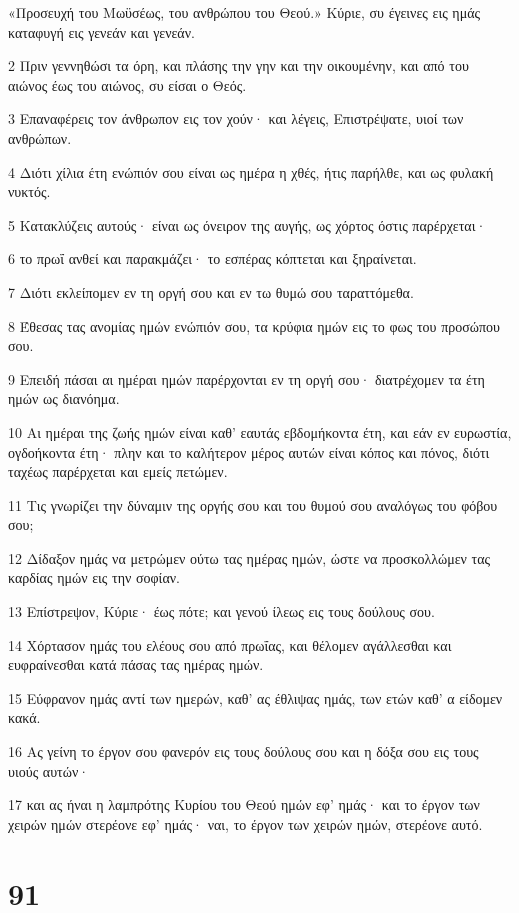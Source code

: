 \par «Προσευχή του Μωϋσέως, του ανθρώπου του Θεού.» Κύριε, συ έγεινες εις ημάς καταφυγή εις γενεάν και γενεάν.
\par 2 Πριν γεννηθώσι τα όρη, και πλάσης την γην και την οικουμένην, και από του αιώνος έως του αιώνος, συ είσαι ο Θεός.
\par 3 Επαναφέρεις τον άνθρωπον εις τον χούν· και λέγεις, Επιστρέψατε, υιοί των ανθρώπων.
\par 4 Διότι χίλια έτη ενώπιόν σου είναι ως ημέρα η χθές, ήτις παρήλθε, και ως φυλακή νυκτός.
\par 5 Κατακλύζεις αυτούς· είναι ως όνειρον της αυγής, ως χόρτος όστις παρέρχεται·
\par 6 το πρωΐ ανθεί και παρακμάζει· το εσπέρας κόπτεται και ξηραίνεται.
\par 7 Διότι εκλείπομεν εν τη οργή σου και εν τω θυμώ σου ταραττόμεθα.
\par 8 Έθεσας τας ανομίας ημών ενώπιόν σου, τα κρύφια ημών εις το φως του προσώπου σου.
\par 9 Επειδή πάσαι αι ημέραι ημών παρέρχονται εν τη οργή σου· διατρέχομεν τα έτη ημών ως διανόημα.
\par 10 Αι ημέραι της ζωής ημών είναι καθ' εαυτάς εβδομήκοντα έτη, και εάν εν ευρωστία, ογδοήκοντα έτη· πλην και το καλήτερον μέρος αυτών είναι κόπος και πόνος, διότι ταχέως παρέρχεται και εμείς πετώμεν.
\par 11 Τις γνωρίζει την δύναμιν της οργής σου και του θυμού σου αναλόγως του φόβου σου;
\par 12 Δίδαξον ημάς να μετρώμεν ούτω τας ημέρας ημών, ώστε να προσκολλώμεν τας καρδίας ημών εις την σοφίαν.
\par 13 Επίστρεψον, Κύριε· έως πότε; και γενού ίλεως εις τους δούλους σου.
\par 14 Χόρτασον ημάς του ελέους σου από πρωΐας, και θέλομεν αγάλλεσθαι και ευφραίνεσθαι κατά πάσας τας ημέρας ημών.
\par 15 Εύφρανον ημάς αντί των ημερών, καθ' ας έθλιψας ημάς, των ετών καθ' α είδομεν κακά.
\par 16 Ας γείνη το έργον σου φανερόν εις τους δούλους σου και η δόξα σου εις τους υιούς αυτών·
\par 17 και ας ήναι η λαμπρότης Κυρίου του Θεού ημών εφ' ημάς· και το έργον των χειρών ημών στερέονε εφ' ημάς· ναι, το έργον των χειρών ημών, στερέονε αυτό.

\chapter{91}

